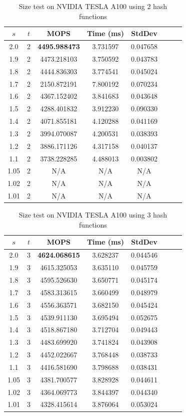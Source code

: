 \documentclass[10pt,twocolumn,letterpaper]{article}
\begin{document}
\begin{table}[h]
    \centering
   \begin{tabular}{@{}c|ccccccc@{}}
\toprule
$s$ & $t$ & MOPS    & Time (ms)& StdDev  \\ \midrule
2.0 & 2 & \textbf{4495.988473} & 3.731597 & 0.047658 \\
1.9 & 2 & 4473.218103 & 3.750592 & 0.043783 \\
1.8 & 2 & 4444.836303 & 3.774541 & 0.045024 \\
1.7 & 2 & 2150.872191 & 7.800192 & 0.070234 \\
1.6 & 2 & 4367.152402 & 3.841683 & 0.043648 \\
1.5 & 2 & 4288.401832 & 3.912230 & 0.090330 \\
1.4 & 2 & 4071.855181 & 4.120288 & 0.041169 \\
1.3 & 2 & 3994.070087 & 4.200531 & 0.038393 \\
1.2 & 2 & 3886.171126 & 4.317158 & 0.040137 \\
1.1 & 2 & 3738.228285 & 4.488013 & 0.003802 \\
1.05 & 2 & N/A & N/A & N/A \\
1.02 & 2 & N/A & N/A & N/A \\
1.01 & 2 & N/A & N/A & N/A \\
\bottomrule
\end{tabular}
    \caption{Size test on NVIDIA TESLA A100 using $2$ hash functions}
    \label{tab:size_2_A100}
\end{table}

\begin{table}[!h]
    \centering
   \begin{tabular}{@{}c|ccccccc@{}}
\toprule
$s$ & $t$ & MOPS    & Time (ms)& StdDev  \\ \midrule
2.0 & 3 & \textbf{4624.068615} & 3.628237 & 0.044546 \\
1.9 & 3 & 4615.325053 & 3.635110 & 0.045759 \\
1.8 & 3 & 4595.526630 & 3.650771 & 0.045174 \\
1.7 & 3 & 4583.313615 & 3.660499 & 0.048979 \\
1.6 & 3 & 4556.363571 & 3.682150 & 0.045424 \\
1.5 & 3 & 4539.911130 & 3.695494 & 0.052675 \\
1.4 & 3 & 4518.867180 & 3.712704 & 0.049443 \\
1.3 & 3 & 4483.699920 & 3.741824 & 0.043908 \\
1.2 & 3 & 4452.022667 & 3.768448 & 0.038733 \\
1.1 & 3 & 4416.581690 & 3.798688 & 0.038431 \\
1.05 & 3 & 4381.700577 & 3.828928 & 0.044611 \\
1.02 & 3 & 4364.069773 & 3.844397 & 0.044340 \\
1.01 & 3 & 4328.415614 & 3.876064 & 0.053024 \\
\bottomrule
\end{tabular}
    \caption{Size test on NVIDIA TESLA A100 using $3$ hash functions}
    \label{tab:size_3_A100}
\end{table}
\end{document}
